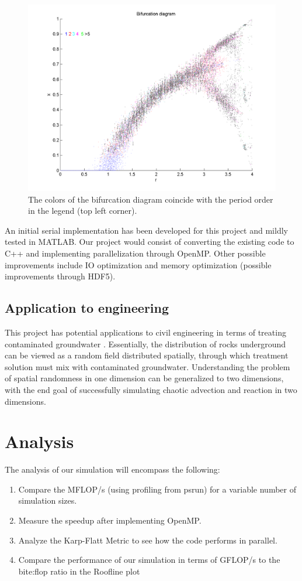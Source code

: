 \documentclass[12pt]{article}
\newcommand{\be}{\begin{enumerate}}
\newcommand{\ee}{\end{enumerate}}
\begin{document}
\begin{figure}[H]
	\begin{center}
		\includegraphics[scale=0.5]{bif}
\caption{The colors of the bifurcation diagram coincide with the
  period order in the legend (top left corner).}
	\end{center}
\end{figure}
An initial serial implementation has been developed for this project and mildly tested in
MATLAB. Our project would consist of converting the existing code to
C++ and implementing parallelization through OpenMP. Other possible improvements include
IO optimization and memory optimization (possible improvements through
HDF5). 

\subsection{Application to engineering}
This project has potential applications to civil engineering in terms
of treating contaminated groundwater \cite{neupauer}. Essentially, the
distribution of rocks underground can be viewed as a random field
distributed spatially, through which treatment solution must mix with
contaminated groundwater. Understanding the problem of spatial
randomness in one dimension can be generalized to two dimensions, with
the end goal of successfully simulating chaotic advection and reaction in two dimensions. 

\section{Analysis}
The analysis of our simulation will encompass the following:
\be
\item Compare the MFLOP/s (using profiling from psrun) for a variable number of simulation
sizes. 
\item Measure the speedup after implementing OpenMP. 
\item Analyze the Karp-Flatt Metric to see how the code
  performs in parallel. 
\item Compare the performance of our simulation in terms of GFLOP/s to
  the bite:flop ratio in the Roofline plot
\ee



\end{document}
